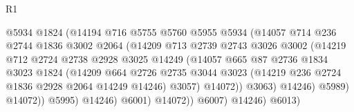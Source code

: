 \begin{lexlean}{R1}
\begin{coremodule}
                                    @5934
                                    @1824
                                    (@14194
                                      @716
                                      @5755
                                      @5760
                                      @5955
                                      @5934
                                      (@14057
                                        @714
                                        @236
                                        @2744
                                        @1836
                                        @3002
                                        @2064
                                        (@14209
                                          @713
                                          @2739
                                          @2743
                                          @3026
                                          @3002
                                          (@14219
                                            @712
                                            @2724
                                            @2738
                                            @2928
                                            @3025
                                            @14249
                                            (@14057
                                              @665
                                              @87
                                              @2736
                                              @1834
                                              @3023
                                              @1824
                                              (@14209
                                                @664
                                                @2726
                                                @2735
                                                @3044
                                                @3023
                                                (@14219 @236 @2724 @1836 @2928 @2064 @14249 @14246)
                                                @3057)
                                              @14072))
                                          @3063)
                                        @14246)
                                      @5989)
                                    @14072))
                                @5995)
                              @14246)
                            @6001)
                          @14072))
                      @6007)
                    @14246)
                  @6013)

\end{coremodule}
\end{lexlean}
